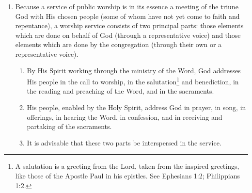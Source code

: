 \documentclass[
]{book}
\providecommand{\tightlist}{%
  \setlength{\itemsep}{0pt}\setlength{\parskip}{0pt}}
\begin{document}
\protect\hypertarget{chapter-slug-52-the-parts-of-public-worship}{\href{}{}}

\begin{enumerate}
\def\labelenumi{\arabic{enumi}.}
\tightlist
\item
  \protect\hypertarget{52}{\href{}{}}Because a service of public worship is in its essence a meeting of the triune God with His chosen people (some of whom have not yet come to faith and repentance), a worship service consists of two principal parts: those elements which are done on behalf of God (through a representative voice) and those elements which are done by the congregation (through their own or a representative voice).

  \begin{enumerate}
  \def\labelenumii{\alph{enumii}.}
  \tightlist
  \item
    By His Spirit working through the ministry of the Word, God addresses His people in the call to worship, in the salutation\footnote{A salutation is a greeting from the Lord, taken from the inspired greetings, like those of the Apostle Paul in his epistles. See Ephesians 1:2; Philippians 1:2.} and benediction, in the reading and preaching of the Word, and in the sacraments.
  \item
    His people, enabled by the Holy Spirit, address God in prayer, in song, in offerings, in hearing the Word, in confession, and in receiving and partaking of the sacraments.
  \item
    It is advisable that these two parts be interspersed in the service.
  \end{enumerate}
\end{enumerate}
\end{document}
